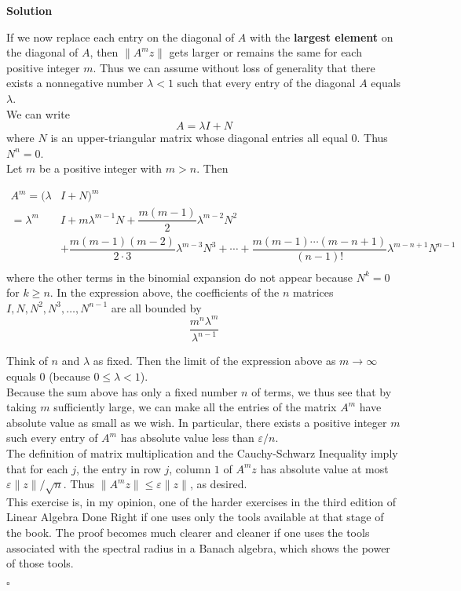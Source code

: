 \documentclass{article}
\newenvironment{solution}{%
{
    \textbf{Solution\\}
    }
}{
  \hfill $\square$ 
  \par\bigskip 
}
\begin{document}
\begin{CJK}{UTF8}{gkai}
\begin{solution}
    If we now replace each entry on the diagonal of $A$ with the \textbf{largest element} on the diagonal of $A$, then $\|A^m z\|$ gets larger or remains the same for each positive integer $m$. Thus we can assume without loss of generality that there exists a nonnegative number $\lambda <1$ such that every entry of the diagonal $A$ equals $\lambda$.\\
    
    We can write
    \[A=\lambda I+N\]
    where $N$ is an upper-triangular matrix whose diagonal entries all equal $0$. Thus $N^n=0$.\\
    
    Let $m$ be a positive integer with $m > n$. Then
    
    \[\begin{aligned}
        A^m =(\lambda& I+N)^m\\
        =\lambda^m& I+m\lambda^{m-1}N + \dfrac{m(m-1)}{2} \lambda^{m-2} N^2 \\
        &+ \dfrac{m(m-1)(m-2)}{2\cdot 3}\lambda^{m-3} N^3 +\cdots+ \dfrac{m(m-1)\cdots(m-n+1)}{(n-1)!}\lambda^{m-n+1}N^{n-1}\\
    \end{aligned}\]
    where the other terms in the binomial expansion do not appear because $N^k=0$ for $k\geq n$. In the expression above, the coefficients of the $n$ matrices $I, N, N^2, N^3, \ldots, N^{n-1}$ are all bounded by \[\dfrac{m^n\lambda^m}{\lambda^{n-1}}\]

    Think of $n$ and $\lambda$ as fixed. Then the limit of the expression above as $m\to \infty$ equals $0$ (because $0\leq \lambda <1$).\\
    
    Because the sum above has only a fixed number $n$ of terms, we thus see that by taking $m$ sufficiently large, we can make all the entries of the matrix $A^m$ have absolute value as small as we wish. In particular, there exists a positive integer $m$ such every entry of $A^m$ has absolute value less than $\varepsilon/n$.\\
    
    The definition of matrix multiplication and the Cauchy-Schwarz Inequality imply that for each $j$, the entry in row $j$, column $1$ of $A^m z$  has absolute value at most $\varepsilon\|z\|/\sqrt{n}$. Thus $\|A^m z\|\leq \varepsilon\|z\|$, as desired.\\
    
    This exercise is, in my opinion, one of the harder exercises in the third edition of Linear Algebra Done Right if one uses only the tools available at that stage of the book. The proof becomes much clearer and cleaner if one uses the tools associated with the spectral radius in a Banach algebra, which shows the power of those tools.
\end{solution}


\end{CJK}
\end{document}
